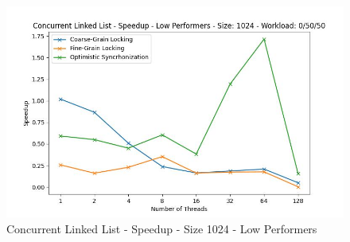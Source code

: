 \documentclass[../final_report.tex]{subfiles}
\begin{document}
\begin{figure}[H]
        \includegraphics[scale=0.4]{outFiles/plots/concurrent_data_structs_low_speedup_1024_0_50_50.jpg}
    \caption{Concurrent Linked List - Speedup - Size 1024 - Low Performers}
    \label{fig:Concurrent Linked List - Speedup - Size 1024 - Low Performers}
\end{figure}
\end{document}
